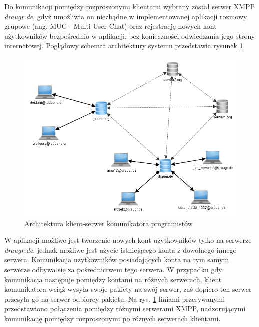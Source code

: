 \documentclass[polish,11pt,a4paper,twoside]{article}
\begin{document}
Do komunikacji pomiędzy rozproszonymi klientami wybrany został serwer XMPP \emph{draugr.de}, gdyż umożliwia on niezbądne w implementowanej aplikacji rozmowy grupowe (ang. MUC - Multi User Chat) oraz rejestrację nowych kont użytkowników bezpośrednio w aplikacji, bez konieczności odwiedzania jego strony internetowej. Poglądowy schemat architektury systemu przedstawia rysunek \ref{fig:architektura}.

\begin{figure}[!htb]
  \begin{center}
    \includegraphics[width=1.0\textwidth]{img/architektura.png}
    \caption{Architektura klient-serwer komunikatora programistów} \label{fig:architektura} 
  \end{center}
\end{figure}

W aplikacji możliwe jest tworzenie nowych kont użytkowników tylko na serwerze \emph{draugr.de}, jednak możliwe jest użycie istniejącego konta z dowolnego innego serwera. Komunikacja użytkowników posiadających konta na tym samym serwerze odbywa się za pośrednictwem tego serwera. W przypadku gdy komunikacja następuje pomiędzy kontami na różnych serwerach, klient komunikatora wciąż wysyła swoje pakiety na swój serwer, zaś dopiero ten serwer przesyła go na serwer odbiorcy pakietu. Na rys. \ref{fig:architektura} liniami przerywanymi przedstawiono połączenia pomiędzy różnymi serwerami XMPP, nadzorującymi komunikację pomiędzy rozproszonymi po różnych serwerach klientami.

\end{document}
